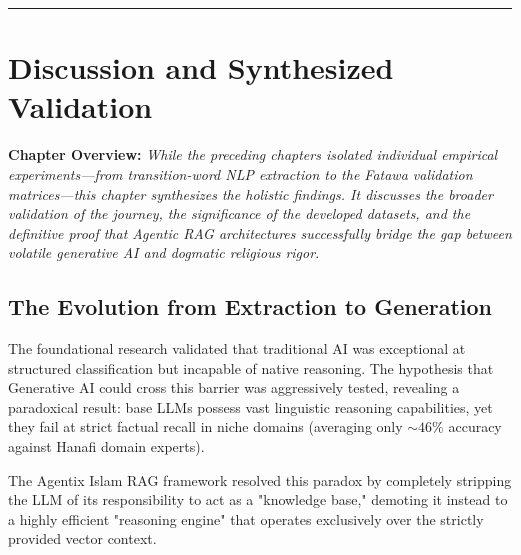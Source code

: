 \documentclass[12pt, a4paper]{report}
\begin{document}
\vspace{1cm}
\noindent\rule{\textwidth}{1pt}\vspace{0.5cm}



\vspace{1cm}
\noindent{}
\newpage


\chapter{Discussion and Synthesized Validation}
\label{chap:Discussion_and_Synthesized_Validation}

\textbf{Chapter Overview:} \textit{While the preceding chapters isolated individual empirical experiments—from transition-word NLP extraction to the Fatawa validation matrices—this chapter synthesizes the holistic findings. It discusses the broader validation of the journey, the significance of the developed datasets, and the definitive proof that Agentic RAG architectures successfully bridge the gap between volatile generative AI and dogmatic religious rigor.}

\section{The Evolution from Extraction to Generation}
The foundational research validated that traditional AI was exceptional at structured classification but incapable of native reasoning. The hypothesis that Generative AI could cross this barrier was aggressively tested, revealing a paradoxical result: base LLMs possess vast linguistic reasoning capabilities, yet they fail at strict factual recall in niche domains (averaging only $\sim46\%$ accuracy against Hanafi domain experts). 

The Agentix Islam RAG framework resolved this paradox by completely stripping the LLM of its responsibility to act as a "knowledge base," demoting it instead to a highly efficient "reasoning engine" that operates exclusively over the strictly provided vector context.
\end{document}
